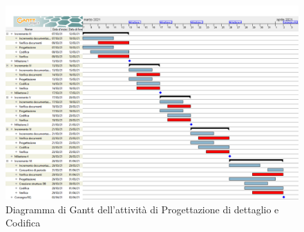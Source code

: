 \begin{landscape}

\begin{figure}[h]
 	\centering
	\includegraphics[width=\linewidth]{Images/GanttPianificazioneProgettazioneDettaglioCodifica.png}
	\caption{Diagramma di Gantt dell'attività di Progettazione di dettaglio e Codifica}
\end{figure}

\end{landscape}